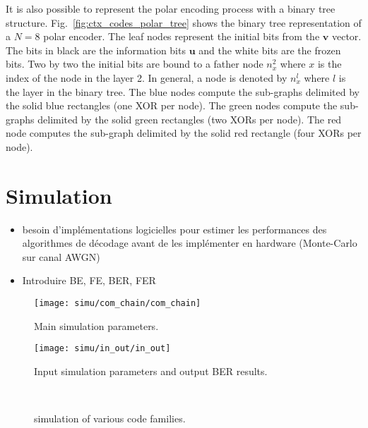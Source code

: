 It is also possible to represent the polar encoding process with a binary tree
structure. Fig.~\ref{fig:ctx_codes_polar_tree} shows the binary tree
representation of a $N = 8$ polar encoder. The leaf nodes represent the initial
bits from the $\bm{v}$ vector. The bits in black are the information bits
$\bm{u}$ and the white bits are the frozen bits. Two by two the initial bits are
bound to a father node $n_x^2$ where $x$ is the index of the node in the layer
2. In general, a node is denoted by $n_x^l$ where $l$ is the layer in the binary
tree. The {\color{Paired-1} blue} nodes compute the sub-graphs delimited by the
solid {\color{Paired-1} blue} rectangles (one XOR per node). The
{\color{Paired-3} green} nodes compute the sub-graphs delimited by the solid
{\color{Paired-3} green} rectangles (two XORs per node). The {\color{Paired-5}
red} node computes the sub-graph delimited by the solid {\color{Paired-5} red}
rectangle (four XORs per node).

\section{Simulation}

\begin{itemize}
  \item besoin d'implémentations logicielles pour estimer les performances des
    algorithmes de décodage avant de les implémenter en hardware (Monte-Carlo
    sur canal AWGN)
  \item Introduire BE, FE, BER, FER
\end{itemize}

\begin{figure}[htp]
  \centering
  \texttt{[image: simu/com\_chain/com\_chain]}
  \caption{Main simulation parameters.}
  \label{fig:simu_com_chain}
\end{figure}

\begin{figure}[htp]
  \centering
  \texttt{[image: simu/in\_out/in\_out]}
  \caption{Input simulation parameters and output BER results.}
  \label{fig:intro_in_out}
\end{figure}

\begin{figure}[htp]
  \centering
    \quad{}
     \quad{}
    \\
      \quad{}
   \quad{}
  \caption{\AFFECT simulation of various code families.}
  \label{fig:intro_bfer}
\end{figure}

